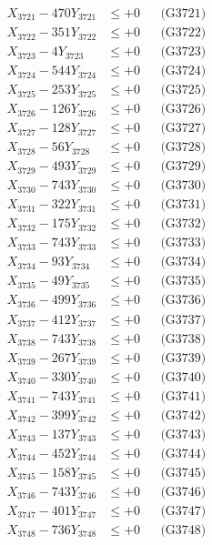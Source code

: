 \documentclass[a4paper,10pt]{article}
\begin{document}
{\begin{align}
\allowbreak
X_{3721} - 470Y_{3721} &\leq +0 && \text{(G3721)} \\
X_{3722} - 351Y_{3722} &\leq +0 && \text{(G3722)} \\
X_{3723} - 4Y_{3723} &\leq +0 && \text{(G3723)} \\
X_{3724} - 544Y_{3724} &\leq +0 && \text{(G3724)} \\
X_{3725} - 253Y_{3725} &\leq +0 && \text{(G3725)} \\
X_{3726} - 126Y_{3726} &\leq +0 && \text{(G3726)} \\
X_{3727} - 128Y_{3727} &\leq +0 && \text{(G3727)} \\
X_{3728} - 56Y_{3728} &\leq +0 && \text{(G3728)} \\
X_{3729} - 493Y_{3729} &\leq +0 && \text{(G3729)} \\
X_{3730} - 743Y_{3730} &\leq +0 && \text{(G3730)} \\
\allowbreak
X_{3731} - 322Y_{3731} &\leq +0 && \text{(G3731)} \\
X_{3732} - 175Y_{3732} &\leq +0 && \text{(G3732)} \\
X_{3733} - 743Y_{3733} &\leq +0 && \text{(G3733)} \\
X_{3734} - 93Y_{3734} &\leq +0 && \text{(G3734)} \\
X_{3735} - 49Y_{3735} &\leq +0 && \text{(G3735)} \\
X_{3736} - 499Y_{3736} &\leq +0 && \text{(G3736)} \\
X_{3737} - 412Y_{3737} &\leq +0 && \text{(G3737)} \\
X_{3738} - 743Y_{3738} &\leq +0 && \text{(G3738)} \\
X_{3739} - 267Y_{3739} &\leq +0 && \text{(G3739)} \\
X_{3740} - 330Y_{3740} &\leq +0 && \text{(G3740)} \\
\allowbreak
X_{3741} - 743Y_{3741} &\leq +0 && \text{(G3741)} \\
X_{3742} - 399Y_{3742} &\leq +0 && \text{(G3742)} \\
X_{3743} - 137Y_{3743} &\leq +0 && \text{(G3743)} \\
X_{3744} - 452Y_{3744} &\leq +0 && \text{(G3744)} \\
X_{3745} - 158Y_{3745} &\leq +0 && \text{(G3745)} \\
X_{3746} - 743Y_{3746} &\leq +0 && \text{(G3746)} \\
X_{3747} - 401Y_{3747} &\leq +0 && \text{(G3747)} \\
X_{3748} - 736Y_{3748} &\leq +0 && \text{(G3748)} \\

\end{align}}
\end{document}
